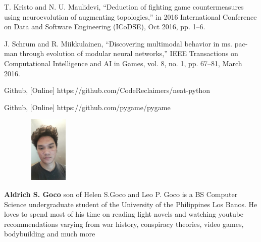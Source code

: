 \documentclass[journal]{IEEEtran}
\begin{document}
\begin{thebibliography}{99}
 T. Kristo and N. U. Maulidevi, “Deduction of fighting game countermeasures using neuroevolution of augmenting topologies,”
in 2016 International Conference on Data and Software
Engineering (ICoDSE), Oct 2016, pp. 1–6.

 J. Schrum and R. Miikkulainen, “Discovering multimodal behavior in ms. pac-man through evolution of modular neural networks,” IEEE Transactions on Computational Intelligence and AI in Games, vol. 8, no. 1, pp. 67–81, March 2016.

 Github, [Online] https://github.com/CodeReclaimers/neat-python

 Github, [Online] https://github.com/pygame/pygame
 
\end{thebibliography}

\begin{figure}
\includegraphics[width=1in,height=1.25in,clip,keepaspectratio]{selfie.jpg}
\end{figure}\par

   \textbf{Aldrich S. Goco} son of Helen S.Goco and Leo P. Goco is a BS Computer Science undergraduate student of the University of the Philippines Los Banos. He loves to spend most of his time on reading light novels and watching youtube recommendations varying from war history, conspiracy theories, video games, bodybuilding and much more
\end{document}
